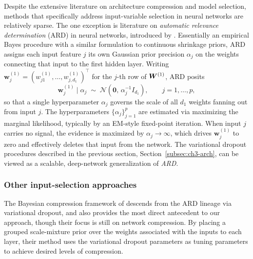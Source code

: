 Despite the extensive literature on architecture compression and model selection, methods
that specifically address input-variable selection in neural
networks are relatively sparse.  The one exception is literature on \textit{automatic relevance determination} (ARD) in neural networks, introduced by \citet{domany_bayesian_1996, neal_bayesian_2012}.  Essentially an empirical Bayes procedure with a similar formulation to continuous shrinkage priors, ARD assigns each input
feature $j$ its own Gaussian prior precision $\alpha_j$ on the weights
connecting that input to the first hidden layer.  Writing
$\mathbf{w}_j^{(1)} = (w_{j1}^{(1)}, \ldots, w_{j,d_1}^{(1)})^\top$ for
the $j$-th row of $\bm{W}^{(1)}$, ARD posits
\begin{equation}
  \mathbf{w}_j^{(1)} \mid \alpha_j
  \;\sim\; \mathcal{N}\!\left(\mathbf{0},\, \alpha_j^{-1} I_{d_1}\right),
  \qquad j = 1, \ldots, p,
  \label{eq:ard-prior}
\end{equation}
so that a single hyperparameter $\alpha_j$ governs the scale of all
$d_1$ weights fanning out from input $j$.  The hyperparameters
$\{\alpha_j\}_{j=1}^p$ are estimated via maximizing the marginal
likelihood, typically
by an EM-style fixed-point iteration.  When input $j$ carries no
signal, the evidence is maximized by $\alpha_j \to \infty$, which
drives $\mathbf{w}_j^{(1)}$ to zero and effectively deletes that input
from the network.  The variational dropout procedures described in the previous section, Section~\ref{subsec:ch3-arch}, can be viewed as a scalable, deep-network generalization of \textit{ARD}.

\subsubsection*{Other input-selection approaches}
\label{subsubsec:ch3-input}

The Bayesian compression framework of \citet{louizos2017bayesian} descends from the ARD lineage via variational dropout, and also provides the most direct antecedent to our approach, though their focus is still on network compression.  By placing a grouped scale-mixture prior over the weights associated with the inputs to each layer, their method uses the variational dropout parameters as tuning parameters to achieve desired levels of compression.

